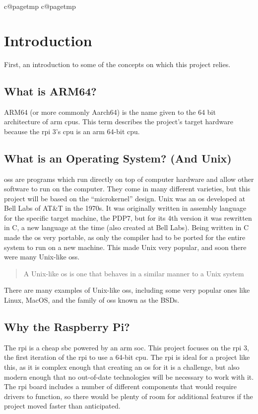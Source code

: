 \documentclass{article}
\makeatletter
\newcommand{\mypagenumbering}[1]{%
    \ifcsname c@pagetmp\endcsname
    \else
        \newcounter{pagetmp}
    \fi
    \setcounter{pagetmp}{\value{page}}
    \pagenumbering{#1}
    \setcounter{page}{\value{pagetmp}}
}
\makeatother
\begin{document}
{\mypagenumbering{roman}\hypersetup{hidelinks} \tableofcontents}
\clearpage
\mypagenumbering{arabic}

\section{Introduction}
First, an introduction to some of the concepts on which this project relies.

\subsection{What is ARM64?}
ARM64 (or more commonly Aarch64) is the name given to the 64 bit architecture
of \gls{arm} \glspl{cpu}. This term describes the project's target hardware
because the \gls{rpi} 3's \gls{cpu} is an \gls{arm} 64-bit \gls{cpu}.

\subsection{What is an Operating System? (And Unix)}
\glspl{os} are programs which run directly on top of computer hardware and
allow other software to run on the computer. They come in many different
varieties, but this project will be based on the ``microkernel'' design. Unix
was an \gls{os} developed at Bell Labs of AT\&T in the 1970s. It was originally
written in assembly language for the specific target machine, the PDP7, but for
its 4th version it was rewritten in C, a new language at the time (also created
at Bell Labs). Being written in C made the \gls{os} very portable, as only the
compiler had to be ported for the entire system to run on a new machine. This
made Unix very popular, and soon there were many Unix-like \glspl{os}.
\blockquote[\cite{unix-like}]{A Unix-like \gls{os} is one that behaves in a
similar manner to a Unix system}.
There are many examples of Unix-like \glspl{os}, including some very popular
ones like Linux, MacOS, and the family of \glspl{os} known as the BSDs.

\subsection{Why the Raspberry Pi?}
The \gls{rpi} is a cheap \gls{sbc} powered by an \gls{arm} \gls{soc}. This
project focuses on the \gls{rpi} 3, the first iteration of the \gls{rpi} to use
a 64-bit \gls{cpu}. The \gls{rpi} is ideal for a project like this, as it is
complex enough that creating an \gls{os} for it is a challenge, but also modern
enough that no out-of-date technologies will be necessary to work with it. The
\gls{rpi} board includes a number of different components that would require
drivers to function, so there would be plenty of room for additional features
if the project moved faster than anticipated.
\end{document}
